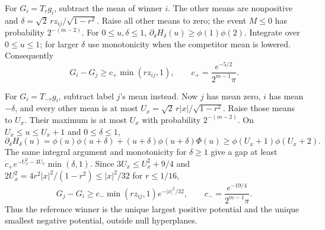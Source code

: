 For $G_i=T_rg_i$, subtract the mean of winner $i$.
The other means are nonpositive and
$\delta=\sqrt2\,r z_{ij}/\sqrt{1-r^2}$.
Raise all other means to zero; the event $M\leq0$ has probability
$2^{-(m-2)}$. For $0\leq u,\delta\leq1$,
$\partial_\delta H_\delta(u)\geq\phi(1)\phi(2)$.
Integrate over $0\leq u\leq1$; for larger $\delta$ use monotonicity when the
competitor mean is lowered. Consequently
\begin{equation}\label{eq:plus-gap}
 G_i-G_j\geq c_+\min(rz_{ij},1),\qquad
 c_+=\frac{e^{-5/2}}{2^{m-1}\pi}.
\end{equation}

For $G_i=T_{-r}g_i$, subtract label $j$'s mean instead.
Now $j$ has mean zero, $i$ has mean $-\delta$, and every other mean is at most
$U_x=\sqrt2\,r|x|/\sqrt{1-r^2}$. Raise those means to $U_x$.
Their maximum is at most $U_x$ with probability $2^{-(m-2)}$.
On $U_x\leq u\leq U_x+1$ and $0\leq\delta\leq1$,
\[
 \partial_\delta H_\delta(u)
 =\phi(u)\phi(u+\delta)+(u+\delta)\phi(u+\delta)\Phi(u)
 \geq\phi(U_x+1)\phi(U_x+2).
\]
The same integral argument and monotonicity for $\delta\geq1$ give a gap at
least $c_+e^{-U_x^2-3U_x}\min(\delta,1)$. Since
$3U_x\leq U_x^2+9/4$ and
$2U_x^2=4r^2|x|^2/(1-r^2)\leq|x|^2/32$ for $r\leq1/16$,
\begin{equation}\label{eq:minus-gap}
 G_j-G_i\geq c_-\min(rz_{ij},1)e^{-|x|^2/32},
 \qquad c_-=\frac{e^{-19/4}}{2^{m-1}\pi}.
\end{equation}
Thus the reference winner is the unique largest positive potential and the
unique smallest negative potential, outside null hyperplanes.

